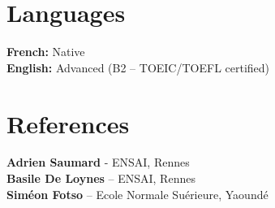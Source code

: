 \documentclass[letterpaper,11pt]{article}
\begin{document}
\section{Languages}
\begin{itemize}[leftmargin=0.15in, label={}]
  \small{\item{
    \textbf{French:} Native \\
    \textbf{English:} Advanced (B2 – TOEIC/TOEFL certified)
  }}
\end{itemize}

\section{References}
\textbf{Adrien Saumard} - ENSAI, Rennes \\
\textbf{Basile De Loynes} – ENSAI, Rennes \\
\textbf{Siméon Fotso} – Ecole Normale Suérieure, Yaoundé \\
\end{document}
